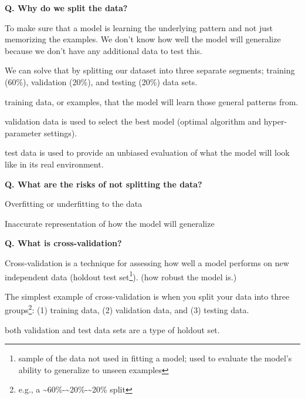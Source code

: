 \begin{frame}[fragile]{\textbf{Q. Why do we split the data?}}
  \begin{wideitemize}
    \item To make sure that a model is learning the underlying pattern and not
    just memorizing the examples. We don't know how well the model will generalize
    because we don't have any additional data to test this.
    \item We can solve that by splitting our dataset into three separate segments;
    training (60\%), validation (20\%), and testing (20\%) data sets.
    \begin{wideitemize}
      \item training data, or examples, that the model will learn
      those general patterns from.
      \item validation data is used to select the best model (optimal algorithm
      and hyper-parameter settings).
      \item test data is used to provide an unbiased evaluation of what
      the model will look like in its real environment.
    \end{wideitemize}
  \end{wideitemize}
\end{frame}

\begin{frame}[fragile]{\textbf{Q. What are the risks of not splitting the data?}}
  \begin{wideitemize}
    \item Overfitting or underfitting to the data
    \item Inaccurate representation of how the model will generalize
  \end{wideitemize}
\end{frame}

\begin{frame}[fragile]{\textbf{Q. What is cross-validation?}}
  \begin{wideitemize}
    \item Cross-validation is a technique for assessing how well a model
    performs on new independent data (holdout test set\footnote{sample of the
    data not used in fitting a model; used to evaluate the model's ability to
    generalize to unseen examples}). (how robust the model is.)
    \item The simplest example of cross-validation is when you split your
    data into three groups\footnote{e.g., a \~{}60\%-\~{}20\%-\~{}20\% split}:
    (1) training data, (2) validation data, and (3) testing data.
    \item both validation and test data sets are a type of holdout set.
  \end{wideitemize}
\end{frame}

